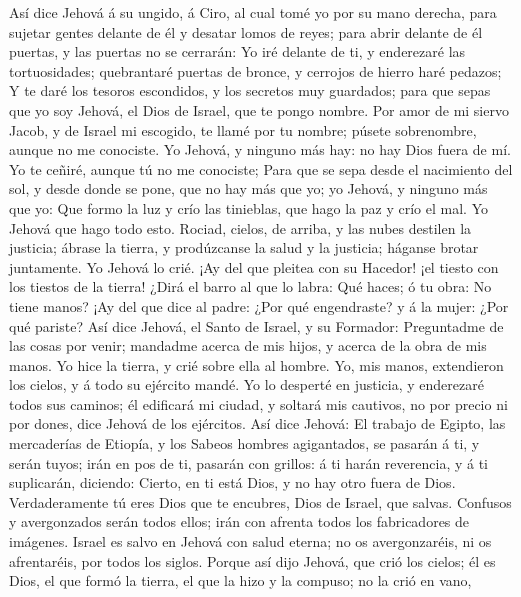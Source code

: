  Así dice Jehová á su ungido, á Ciro, al cual tomé yo por su
mano derecha, para sujetar gentes delante de él y desatar lomos de
reyes; para abrir delante de él puertas, y las puertas no se cerrarán:
 Yo iré delante de ti, y enderezaré las tortuosidades;
quebrantaré puertas de bronce, y cerrojos de hierro haré pedazos;
 Y te daré los tesoros escondidos, y los secretos muy
guardados; para que sepas que yo soy Jehová, el Dios de Israel, que te
pongo nombre.  Por amor de mi siervo Jacob, y de Israel mi
escogido, te llamé por tu nombre; púsete sobrenombre, aunque no me
conociste.  Yo Jehová, y ninguno más hay: no hay Dios fuera
de mí. Yo te ceñiré, aunque tú no me conociste;  Para que se
sepa desde el nacimiento del sol, y desde donde se pone, que no hay más
que yo; yo Jehová, y ninguno más que yo:  Que formo la luz y
crío las tinieblas, que hago la paz y crío el mal. Yo Jehová que hago
todo esto.  Rociad, cielos, de arriba, y las nubes destilen
la justicia; ábrase la tierra, y prodúzcanse la salud y la justicia;
háganse brotar juntamente. Yo Jehová lo crié.  ¡Ay del que
pleitea con su Hacedor! ¡el tiesto con los tiestos de la tierra! ¿Dirá
el barro al que lo labra: Qué haces; ó tu obra: No tiene manos?
 ¡Ay del que dice al padre: ¿Por qué engendraste? y á la
mujer: ¿Por qué pariste?  Así dice Jehová, el Santo de
Israel, y su Formador: Preguntadme de las cosas por venir; mandadme
acerca de mis hijos, y acerca de la obra de mis manos.  Yo
hice la tierra, y crié sobre ella al hombre. Yo, mis manos, extendieron
los cielos, y á todo su ejército mandé.  Yo lo desperté en
justicia, y enderezaré todos sus caminos; él edificará mi ciudad, y
soltará mis cautivos, no por precio ni por dones, dice Jehová de los
ejércitos.  Así dice Jehová: El trabajo de Egipto, las
mercaderías de Etiopía, y los Sabeos hombres agigantados, se pasarán á
ti, y serán tuyos; irán en pos de ti, pasarán con grillos: á ti harán
reverencia, y á ti suplicarán, diciendo: Cierto, en ti está Dios, y no
hay otro fuera de Dios.  Verdaderamente tú eres Dios que te
encubres, Dios de Israel, que salvas.  Confusos y
avergonzados serán todos ellos; irán con afrenta todos los fabricadores
de imágenes.  Israel es salvo en Jehová con salud eterna;
no os avergonzaréis, ni os afrentaréis, por todos los siglos.
 Porque así dijo Jehová, que crió los cielos; él es Dios,
el que formó la tierra, el que la hizo y la compuso; no la crió en vano,
